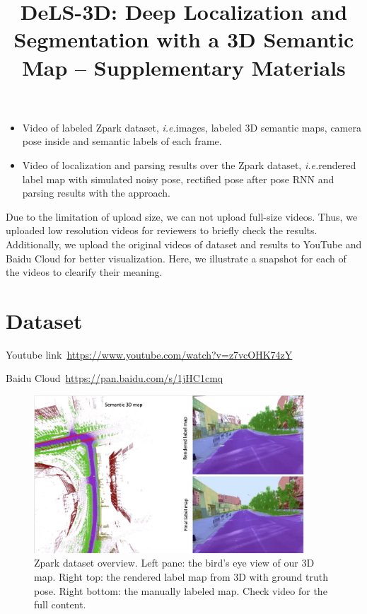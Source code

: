 \documentclass[10pt,twocolumn,letterpaper]{article}
\def\ie{\emph{i.e.}}
\begin{document}
\onecolumn
\title{DeLS-3D: Deep Localization and Segmentation with a 3D Semantic Map -- Supplementary Materials}
\maketitle

\begin{itemize}
\vspace{-0.5\baselineskip}
    \setlength{\itemsep}{-2pt}
    \item Video of labeled Zpark dataset, \ie images, labeled 3D semantic maps, camera pose inside and semantic labels of each frame.
    \item Video of localization and parsing results over the Zpark dataset, \ie rendered label map with simulated noisy pose, rectified pose after pose RNN and parsing results with the approach.
\vspace{-0.4\baselineskip}
\end{itemize}

Due to the limitation of upload size, we can not upload full-size videos. Thus, we uploaded low resolution videos for reviewers to briefly check the results. 
Additionally, we upload the original videos of dataset and results to YouTube and Baidu Cloud for better visualization. Here, we illustrate a snapshot for each of the videos to clearify their meaning.

\section{Dataset} 
Youtube link~\url{https://www.youtube.com/watch?v=z7vcOHK74zY}

Baidu Cloud~\url{https://pan.baidu.com/s/1jHC1cmq}

\begin{figure}[!hbpt]
\center
\includegraphics[width=0.9\textwidth]{fig/dataset_video.pdf}
\caption{Zpark dataset overview. Left pane: the bird's eye view of our 3D map. Right top: the rendered label map from 3D with ground truth pose. Right bottom: the manually labeled map. Check video for the full content.}
\label{fig:framework}
\end{figure}
\end{document}
